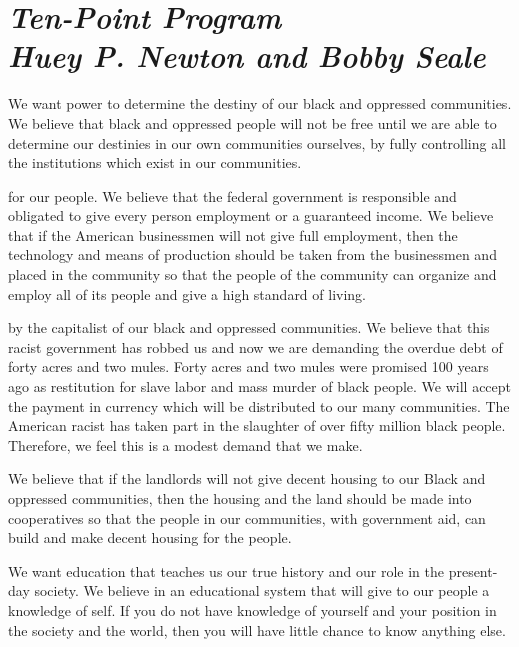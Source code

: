 \documentclass[14pt]{extarticle}
\begin{document}
\raggedright
\section*{\LARGE\sffamily\slshape Ten-Point Program \\ {\large Huey P. Newton and Bobby Seale}}
 {We want power to determine the destiny of our black and oppressed communities.} We believe that black and oppressed people will not be free until we are able to determine our destinies in our own communities ourselves, by fully controlling all the institutions which exist in our communities.


 {for our people.} We believe that the federal government is responsible and obligated to give every person employment or a guaranteed income. We believe that if the American businessmen will not give full employment, then the technology and means of production should be taken from the businessmen and placed in the community so that the people of the community can organize and employ all of its people and give a high standard of living.

 {by the capitalist of our black and oppressed communities.} We believe that this racist government has robbed us and now we are demanding the overdue debt of forty acres and two mules. Forty acres and two mules were promised 100 years ago as restitution for slave labor and mass murder of black people. We will accept the payment in currency which will be distributed to our many communities. The American racist has taken part in the slaughter of over fifty million black people. Therefore, we feel this is a modest demand that we make.

 We believe that if the landlords will not give decent housing to our Black and oppressed communities, then the housing and the land should be made into cooperatives so that the people in our communities, with government aid, can build and make decent housing for the people.


 We want education that teaches us our true history and our role in the present-day society. We believe in an educational system that will give to our people a knowledge of self. If you do not have knowledge of yourself and your position in the society and the world, then you will have little chance to know anything else.
\end{document}
